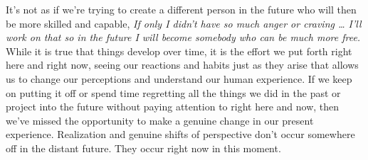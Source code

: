 It's not as if we're trying to create a different person in the future 
who will then be more skilled and capable, \emph{If only I didn't have 
so much anger or craving … I'll work on that so in the future I will 
become somebody who can be much more free.} While it is true that 
things develop over time, it is the effort we put forth right here and 
right now, seeing our reactions and habits just as they arise that 
allows us to change our perceptions and understand our human 
experience. If we keep on putting it off or spend time regretting all 
the things we did in the past or project into the future without paying 
attention to right here and now, then we've missed the opportunity to 
make a genuine change in our present experience. Realization and 
genuine shifts of perspective don't occur somewhere off in the distant 
future. They occur right now in this moment.

